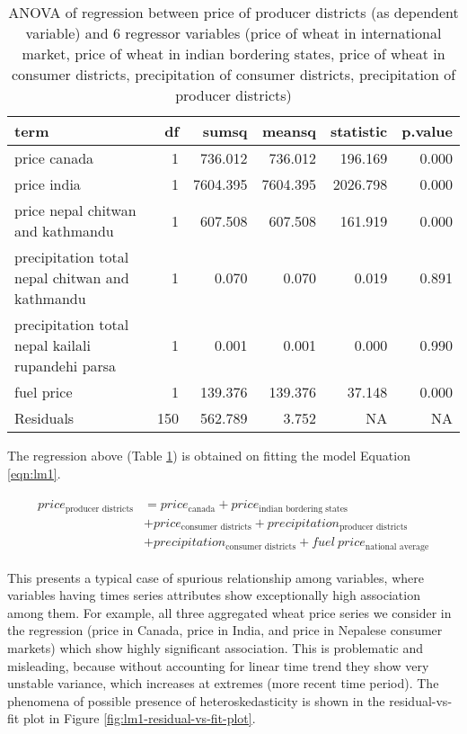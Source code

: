 \documentclass[
  12pt,
]{article}
\begin{document}
\begin{table}[H]

\caption{\label{tab:lm1-without-time}ANOVA of regression between price of producer districts (as dependent variable) and 6 regressor variables (price of wheat in international market, price of wheat in indian bordering states, price of wheat in consumer districts, precipitation of consumer districts, precipitation of producer districts)}
\centering
\begin{tabular}[t]{>{\raggedright\arraybackslash}p{7em}rrrrr}
\toprule
term & df & sumsq & meansq & statistic & p.value\\
\midrule
price canada & 1 & 736.012 & 736.012 & 196.169 & 0.000\\
price india & 1 & 7604.395 & 7604.395 & 2026.798 & 0.000\\
price nepal chitwan and kathmandu & 1 & 607.508 & 607.508 & 161.919 & 0.000\\
precipitation total nepal chitwan and kathmandu & 1 & 0.070 & 0.070 & 0.019 & 0.891\\
precipitation total nepal kailali rupandehi parsa & 1 & 0.001 & 0.001 & 0.000 & 0.990\\
\addlinespace
fuel price & 1 & 139.376 & 139.376 & 37.148 & 0.000\\
Residuals & 150 & 562.789 & 3.752 & NA & NA\\
\bottomrule
\end{tabular}
\end{table}

The regression above (Table \ref{tab:lm1-without-time}) is obtained on fitting the model Equation \ref{eqn:lm1}.

\begin{equation}
\label{eqn:lm1}
\begin{aligned}
\begin{split}
price_{\textrm{producer districts}} &= price_{\textrm{canada}} + price_{\textrm{indian bordering states}} \\ &+
price_{\textrm{consumer districts}} + precipitation_{\textrm{producer districts}} \\ &+
precipitation_{\textrm{consumer districts}} + fuel~price_{\textrm{national average}}
\end{split}
\end{aligned}
\end{equation}

This presents a typical case of spurious relationship among variables, where variables having times series attributes show exceptionally high association among them. For example, all three aggregated wheat price series we consider in the regression (price in Canada, price in India, and price in Nepalese consumer markets) which show highly significant association. This is problematic and misleading, because without accounting for linear time trend they show very unstable variance, which increases at extremes (more recent time period). The phenomena of possible presence of heteroskedasticity is shown in the residual-vs-fit plot in Figure \ref{fig:lm1-residual-vs-fit-plot}.
\end{document}
